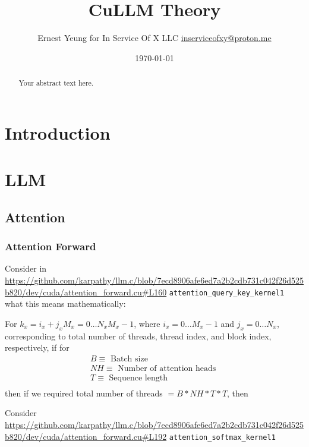 \documentclass[10pt]{amsart}
\title[CuLLM Theory]{CuLLM Theory}
\author{Ernest Yeung for In Service Of X LLC \href{mailto:inserviceofxy@proton.me}{inserviceofxy@proton.me}}
\date{\today}
\begin{document}

\maketitle
\tableofcontents

\begin{multicols*}{2}

\begin{abstract}
Your abstract text here.
\end{abstract}

\section{Introduction}

\section{LLM}
\subsection{Attention}
\subsubsection{Attention Forward}

Consider in \url{https://github.com/karpathy/llm.c/blob/7ecd8906afe6ed7a2b2cdb731c042f26d525b820/dev/cuda/attention_forward.cu#L160} \verb|attention_query_key_kernel1| what this means mathematically:

For $k_x = i_x + j_x M_x = 0 \dots N_x M_x - 1$, where $i_x = 0 \dots M_x - 1$ and $j_x = 0 \dots N_x$, corresponding to total number of threads, thread index, and block index, respectively, if for 
\[
\begin{aligned}
	B \equiv \text{ Batch size} \\
	NH \equiv \text{ Number of attention heads } \\
	T \equiv \text{ Sequence length} \\
\end{aligned}
\]
then if we required total number of threads $ = B * NH * T * T$, then

Consider \url{https://github.com/karpathy/llm.c/blob/7ecd8906afe6ed7a2b2cdb731c042f26d525b820/dev/cuda/attention_forward.cu#L192} \verb|attention_softmax_kernel1|


\end{multicols*}
\end{document}
